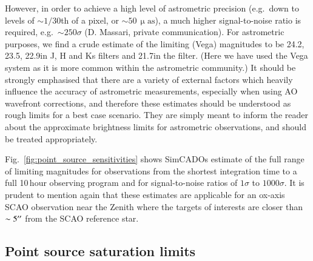 However, in order to achieve a high level of astrometric precision (e.g.\ down to levels of $\sim 1/30$th of a pixel, or $\sim 50\,\upmu\mathrm{as}$), a much higher signal-to-noise ratio is required, e.g.\ $\sim 250\sigma$ (D. Massari, private communication). For astrometric purposes, we find a crude estimate of the limiting (Vega) magnitudes to be 24.2\m, 23.5\m, 22.9\m in J, H and Ks filters and 21.7\m in the \brgamma filter. (Here we have used the Vega system as it is more common within the astrometric community.) It should be strongly emphasised that there are a variety of external factors which heavily influence the accuracy of astrometric measurements, especially when using AO wavefront corrections, and therefore these estimates should be understood as rough limits for a best case scenario. They are simply meant to inform the reader about the approximate brightness limits for astrometric observations, and should be treated appropriately.

Fig.~\ref{fig:point_source_sensitivities} shows SimCADOs estimate of the full range of limiting magnitudes for observations from the shortest integration time to a full 10\,hour observing program and for signal-to-noise ratios of $1\sigma$ to $1000\sigma$. It is prudent to mention again that these estimates are applicable for an ox-axis SCAO observation near the Zenith where the targets of interests are closer than $\sim5^{\prime\prime}$ from the SCAO reference star.


\subsection{Point source saturation limits}
\label{subsec:MICADO_saturation_limits}

